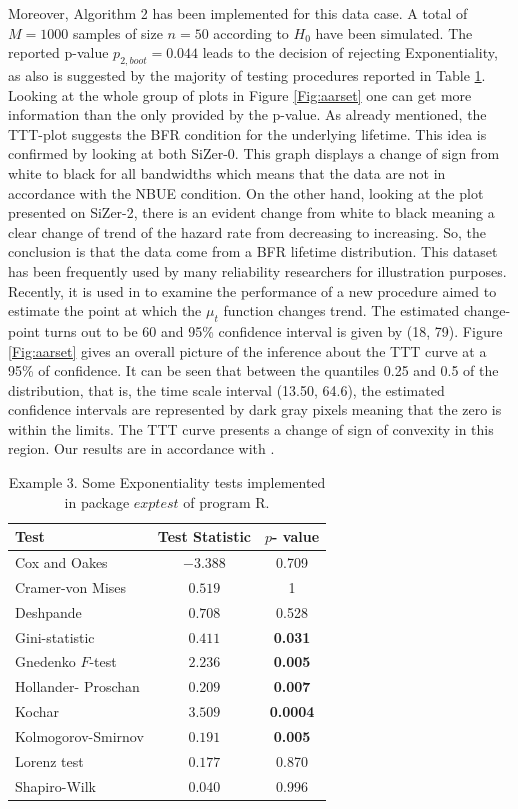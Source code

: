 \documentclass[preprint,12pt]{elsarticle}
\begin{document}
Moreover, Algorithm 2 has been implemented for this data case. A total of $M=1000$ samples of size $n=50$ according to $H_0$ have been simulated. The reported p-value $p_{2,boot}=0.044$ leads to the decision of rejecting Exponentiality, as also is suggested by the majority of testing procedures reported in Table \ref{exp.test.aarset}. Looking at the whole group of plots in Figure \ref{Fig:aarset} one can get more information than the only provided by the p-value. As already mentioned, the TTT-plot suggests the BFR condition for the underlying lifetime. This idea is confirmed by looking at both SiZer-0. This graph displays a change of sign from white to black for all bandwidths which means that the data are not in accordance with the NBUE condition. On the other hand, looking at the plot presented on SiZer-2, there is an evident change from white to black meaning a clear change of trend of the hazard rate from decreasing to increasing. So, the conclusion is that the data come from a BFR lifetime distribution. 
This dataset has been frequently used by many reliability researchers for illustration purposes. Recently, it is used in \cite{KBM2020} to examine the performance of a new procedure aimed to estimate the point at which the $\mu_t$ function changes trend. The estimated change-point turns out to be 60 and 95\% confidence interval is given by (18, 79). Figure \ref{Fig:aarset} gives an overall picture of the inference about the TTT curve at a 95\% of confidence. It can be seen that between the quantiles 0.25 and 0.5 of the distribution, that is, the time scale interval (13.50, 64.6), the estimated confidence intervals are represented by dark gray pixels meaning that the zero is within the limits. The TTT curve presents a change of sign of convexity in this region. Our results are in accordance with \cite{KBM2020}.
%



\begin{table}
\centering
\caption{Example 3. Some Exponentiality tests implemented in package $exptest$ \cite{NPY15} of program R.}
\begin{tabular}{|l|c|c|}  \hline
{\bf Test  }\cite{Ascher90} & Test Statistic & $p$-{ value}  \\ \hline
Cox and Oakes        & $-3.388$ & 0.709 \\ \hline
Cramer-von Mises    & $ 0.519$ &  1 \\ \hline
Deshpande            & $0.708$   &  0.528  \\ \hline 
Gini-statistic      & $ 0.411$   &  {\bf 0.031} \\ \hline  
Gnedenko $F$-test  &  $2.236$     & {\bf 0.005 } \\ \hline 
Hollander- Proschan  &$0.209 $ & {\bf 0.007}   \\ \hline 
Kochar            &  $ 3.509$ & {\bf 0.0004 } \\ \hline 
Kolmogorov-Smirnov & $0.191$ & {\bf 0.005}  \\ \hline 
Lorenz test        & $0.177 $& 0.870 \\ \hline 
Shapiro-Wilk   & $ 0.040$ & 0.996 \\ \hline  
\end{tabular}
\label{exp.test.aarset}
\end{table}
\end{document}
